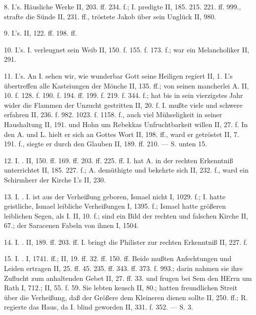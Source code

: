 8.  I.’s. Häusliche Werke II, 203. ff. 234. f.; I. predigte II, 185. 215. 221. ff. 999., strafte die Sünde II, 231. ff., tröstete Jakob über sein Unglück II, 980.

9.  I.’s. II, 122. ff. 198. ff.

10.  I.’s. I. verleugnet sein Weib II, 150. f. 155. f. 173. f.; war ein Melancholiker II, 291.

11.  I.’s. An I. sehen wir, wie wunderbar Gott seine Heiligen regiert II, 1. I.’s  übertreffen alle Kasteiungen der Mönche II, 135. ff.; von seinen mancherlei A. II, 10. f. 128. f. 190. f. 194. ff. 199. f. 219. f. 344. f.; hat bis in sein vierzigstes Jahr wider die Flammen der Unzucht gestritten II, 20. f. I. mußte viele und schwere  erfahren II, 236. f. 982. 1023. f. 1158. f., auch viel Mühseligkeit in seiner Haushaltung II, 191. und Hohn um Rebekkas Unfruchtbarkeit willen II, 27. f. In den A. und L. hielt er sich an Gottes Wort II, 198. ff., ward er getröstet II, 7. 191. f., siegte er durch den Glauben II, 189. ff. 210. — S. unten 15.

12. I. . II, 150. ff. 169. ff. 203. ff. 225. ff. I. hat A. in der rechten Erkenntniß unterrichtet II, 185. 227. f.; A. demüthigte und bekehrte sich II, 232. f., ward ein Schirmherr der Kirche I.’s II, 230.

13. I. . I. ist aus der Verheißung geboren, Ismael nicht I, 1029. f.; I. hatte geistliche, Ismael leibliche Verheißungen I, 1395. f.; Ismael hatte größeren leiblichen Segen, als I. II, 10. f.; sind ein Bild der rechten und falschen Kirche II, 67.; der Saracenen Fabeln von ihnen I, 1504.

14. I. . II, 189. ff. 203. ff. I. bringt die Philister zur rechten Erkenntniß II, 227. f.

15. I. . I, 1741. ff.; II, 19. ff. 32. ff. 150. ff. Beide mußten Anfechtungen und Leiden ertragen II, 25. ff. 45. 235. ff. 343. ff. 373. f. 993.; darin nahmen sie ihre Zuflucht zum anhaltenden Gebet II, 27. ff. 33. und frugen bei Sem den HErrn um Rath I, 712.; II, 55. f. 59. Sie lebten keusch II, 80.; hatten freundlichen Streit über die Verheißung, daß der Größere dem Kleineren dienen sollte II, 250. ff.; R. regierte das Haus, da I. blind geworden II, 331. f. 352. — S.  3.

